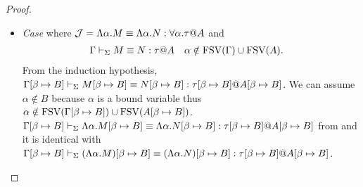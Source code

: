 \begin{proof}
\begin{itemize}
\begin{itemize}
		      \end{itemize}
		      		
		\item \textit{Case} \QGen{} where \(\mathcal{J} = \Lambda\alpha.M \E \Lambda\alpha.N : \forall\alpha.\tau@A\) and 
		      \begin{align*}
		      	  & \G\V M\E N : \tau@A &   & \alpha \notin \FTV(\G)\cup\FTV(A). 
		      \end{align*}
		      From the induction hypothesis, \( \GGV M\SB \E N\SB : \tau\SB@A\SB \).
		      We can assume \(\alpha \notin B \) because \(\alpha\) is a bound variable thus
		      \( \alpha \notin \text{FSV}(\Gamma[\beta \mapsto B])\cup\text{FSV}(A[\beta \mapsto B]) \).
		      \( \GGV \Lambda\alpha.M\SB \E \Lambda\alpha.N\SB : \tau\SB@A\SB \) from \QGen{} and
		      it is identical with \( \GGV (\Lambda\alpha.M)\SB \E (\Lambda\alpha.N)\SB : \tau\SB@A\SB \).
		      		      
	\end{itemize}
\end{proof}

					
					
					
	      	      	      	      	      
	      	      	      	      	      
	      	      	      	      	      
	      	      	      	      	      
	      	      	      	      	      
	      	      	      	      	      
	      	      	      	      	      
	      		      		      		      		      	

